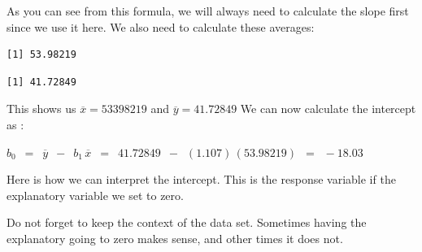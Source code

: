 \documentclass[
  letterpaper,
  DIV=11,
  numbers=noendperiod]{scrreprt}
\newenvironment{Shaded}{\begin{snugshade}}{\end{snugshade}}
\newcommand{\CommentTok}[1]{\textcolor[rgb]{0.37,0.37,0.37}{#1}}
\newcommand{\FunctionTok}[1]{\textcolor[rgb]{0.28,0.35,0.67}{#1}}
\newcommand{\NormalTok}[1]{\textcolor[rgb]{0.00,0.23,0.31}{#1}}
\newcommand{\OtherTok}[1]{\textcolor[rgb]{0.00,0.23,0.31}{#1}}
\newcommand{\SpecialCharTok}[1]{\textcolor[rgb]{0.37,0.37,0.37}{#1}}
\begin{document}
As you can see from this formula, we will always need to calculate the
slope first since we use it here. We also need to calculate these
averages:

\begin{Shaded}
\end{Shaded}

\begin{verbatim}
[1] 53.98219
\end{verbatim}

\begin{Shaded}
\end{Shaded}

\begin{verbatim}
[1] 41.72849
\end{verbatim}

This shows us \(\overline{x} = 53398219\) and
\(\overline{y} = 41.72849\) We can now calculate the intercept as :

\(\displaystyle{b_0\,\,\, = \,\,\, \overline{y} \,\,\, -\,\,\,b_1 \,
\overline{x}\,\,\, =\,\,\, 41.72849\,\,\, - \,\,\, (1.107)\,(53.98219)\,\,\, =
\,\,\,-18.03}\)

\begin{tcolorbox}[enhanced jigsaw, colback=white, colbacktitle=quarto-callout-tip-color!10!white, toptitle=1mm, leftrule=.75mm, arc=.35mm, titlerule=0mm, toprule=.15mm, colframe=quarto-callout-tip-color-frame, left=2mm, coltitle=black, bottomtitle=1mm, title=\textcolor{quarto-callout-tip-color}{\faLightbulb}\hspace{0.5em}{Interpreting the Intercept}, rightrule=.15mm, bottomrule=.15mm, breakable, opacitybacktitle=0.6, opacityback=0]

Here is how we can interpret the intercept. This is the response
variable if the explanatory variable we set to zero.

Do not forget to keep the context of the data set. Sometimes having the
explanatory going to zero makes sense, and other times it does not.

\end{tcolorbox}
\end{document}
